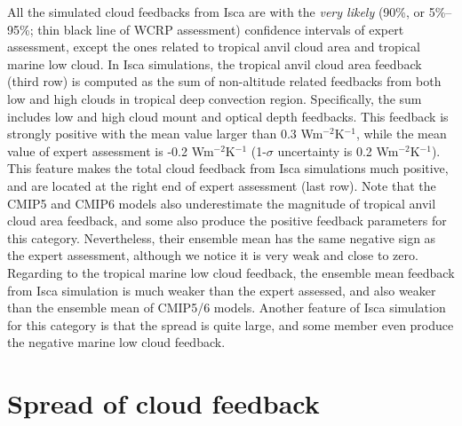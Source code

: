 All the simulated cloud feedbacks from Isca are with the \textit{very likely} (90\%, or 5\%--95\%; thin black line of WCRP assessment) confidence intervals of expert assessment, except the ones related to tropical anvil cloud area and tropical marine low cloud. In Isca simulations, the tropical anvil cloud area feedback (third row) is computed as the sum of non-altitude related feedbacks from both low and high clouds in tropical deep convection region. Specifically, the sum includes low and high cloud mount and optical depth feedbacks. This feedback is strongly positive with the mean value larger than 0.3 Wm$^{-2}$K$^{-1}$, while the mean value of expert assessment is -0.2 Wm$^{-2}$K$^{-1}$ (1-$\sigma$ uncertainty is 0.2 Wm$^{-2}$K$^{-1}$). This feature makes the total cloud feedback from Isca simulations much positive, and are located at the right end of expert assessment (last row). Note that the CMIP5 and CMIP6 models also underestimate the magnitude of tropical anvil cloud area feedback, and some also produce the positive feedback parameters for this category. Nevertheless, their ensemble mean has the same negative sign as the expert assessment, although we notice it is very weak and close to zero. Regarding to the tropical marine low cloud feedback, the ensemble mean feedback from Isca simulation is much weaker than the expert assessed, and also weaker than the ensemble mean of CMIP5/6 models. Another feature of Isca simulation for this category is that the spread is quite large, and some member even produce the negative marine low cloud feedback. 




\section{Spread of cloud feedback}
\label{sec:spread_of_cld_fbk_in_PPE}

